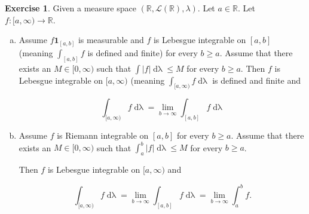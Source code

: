 \documentclass[11pt,oneside]{article}
\numberwithin{equation}{section}
\theoremstyle{definition}
\newtheorem{exercise}{Exercise}
\def\RR{\mathbb{R}}
\def\fancyL{\mathcal{L}}
\def\one{\mathbf{1}}
\begin{document}
\begin{exercise}
  Given a measure space $(\RR, \fancyL(\RR), \lambda)$.  Let $a \in \RR$.  Let $f : [a, \infty) \to \RR$.
\begin{enumerate}[(a)]
\item
  Assume $f \one_{[a, b]}$ is measurable and $f$ is Lebesgue
  integrable on $[a, b]$ (meaning $\int_{[a, b]} f$ is defined and
  finite) for every $b \geq a$.  Assume that there exists
  an $M \in [0, \infty)$ such that $ \int |f| \mathop{d \lambda} \leq M$ for
  every $b \geq a$.  Then $f$ is Lebesgue integrable on $[a, \infty)$
  (meaning $\int _{[a, \infty)} f \mathop{d \lambda}$ is defined and finite and

      \[
      \int _ { [a, \infty)} f \mathop{d \lambda} = \lim \limits _ {b \to \infty} \int _{[a, b]} f \mathop{d \lambda}
      \]

\item
  Assume $f$ is Riemann integrable on $[a, b]$ for every $b \geq a$.
  Assume that there exists an $M \in [0, \infty)$ such
  that $\int _a^b|f| \mathop{d \lambda} \leq M$ for every
  $ b \geq a$.

  Then $f$ is Lebesgue integrable on $[a, \infty)$ and

  \[
  \int _ {[a,\infty)} f \mathop{d \lambda} = \lim \limits_{b \to \infty} \int _ {[a,b]} f \mathop{d \lambda} =
    \lim \limits _ {b \to \infty} \int  _ a ^ b f.
  \]
\end{enumerate}

\end{exercise}
\end{document}
